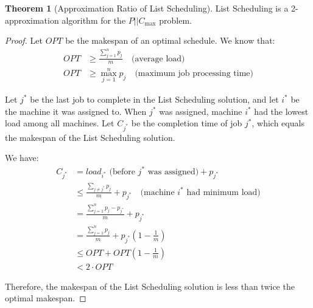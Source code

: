 \documentclass{article}
\theoremstyle{definition}
\newtheorem{theorem}{Theorem}
\begin{document}
\begin{theorem}[Approximation Ratio of List Scheduling]
List Scheduling is a 2-approximation algorithm for the $P||C_{\max}$ problem.
\begin{proof}[Proof]
Let $OPT$ be the makespan of an optimal schedule. We know that:
\begin{align}
OPT &\geq \frac{\sum_{j=1}^{n} p_j}{m} \quad \text{(average load)}\\
OPT &\geq \max_{j=1}^{n} p_j \quad \text{(maximum job processing time)}
\end{align}

Let $j^*$ be the last job to complete in the List Scheduling solution, and let $i^*$ be the machine it was assigned to. When $j^*$ was assigned, machine $i^*$ had the lowest load among all machines. Let $C_{j^*}$ be the completion time of job $j^*$, which equals the makespan of the List Scheduling solution.

We have:
\begin{align}
C_{j^*} &= load_{i^*} \text{ (before $j^*$ was assigned)} + p_{j^*}\\
&\leq \frac{\sum_{j \neq j^*} p_j}{m} + p_{j^*} \quad \text{(machine $i^*$ had minimum load)}\\
&= \frac{\sum_{j=1}^{n} p_j - p_{j^*}}{m} + p_{j^*}\\
&= \frac{\sum_{j=1}^{n} p_j}{m} + p_{j^*}\left(1 - \frac{1}{m}\right)\\
&\leq OPT + OPT\left(1 - \frac{1}{m}\right)\\
&< 2 \cdot OPT
\end{align}

Therefore, the makespan of the List Scheduling solution is less than twice the optimal makespan.
\end{proof}
\end{theorem}
\end{document}
